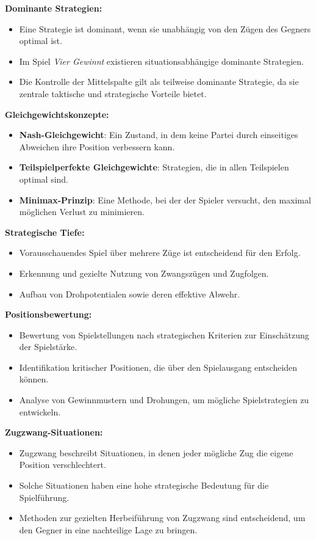 \textbf{Dominante Strategien:}
\begin{itemize}
	\item Eine Strategie ist dominant, wenn sie unabhängig von den Zügen des Gegners optimal ist.
	\item Im Spiel \textit{Vier Gewinnt} existieren situationsabhängige dominante Strategien.
	\item Die Kontrolle der Mittelspalte gilt als teilweise dominante Strategie, da sie zentrale taktische und strategische Vorteile bietet.
\end{itemize}

\textbf{Gleichgewichtskonzepte:}
\begin{itemize}
	\item \textbf{Nash-Gleichgewicht}: Ein Zustand, in dem keine Partei durch einseitiges Abweichen ihre Position verbessern kann.
	\item \textbf{Teilspielperfekte Gleichgewichte}: Strategien, die in allen Teilspielen optimal sind.
	\item \textbf{Minimax-Prinzip}: Eine Methode, bei der der Spieler versucht, den maximal möglichen Verlust zu minimieren.
\end{itemize}

\textbf{Strategische Tiefe:}
\begin{itemize}
	\item Vorausschauendes Spiel über mehrere Züge ist entscheidend für den Erfolg.
	\item Erkennung und gezielte Nutzung von Zwangszügen und Zugfolgen.
	\item Aufbau von Drohpotentialen sowie deren effektive Abwehr.
\end{itemize}

\textbf{Positionsbewertung:}
\begin{itemize}
	\item Bewertung von Spielstellungen nach strategischen Kriterien zur Einschätzung der Spielstärke.
	\item Identifikation kritischer Positionen, die über den Spielausgang entscheiden können.
	\item Analyse von Gewinnmustern und Drohungen, um mögliche Spielstrategien zu entwickeln.
\end{itemize}

\textbf{Zugzwang-Situationen:}
\begin{itemize}
	\item Zugzwang beschreibt Situationen, in denen jeder mögliche Zug die eigene Position verschlechtert.
	\item Solche Situationen haben eine hohe strategische Bedeutung für die Spielführung.
	\item Methoden zur gezielten Herbeiführung von Zugzwang sind entscheidend, um den Gegner in eine nachteilige Lage zu bringen.
\end{itemize}
